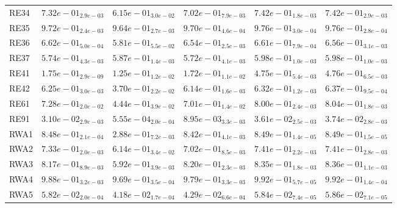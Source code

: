 \documentclass{article}
\begin{document}
\begin{table}
\begin{scriptsize}
\begin{tabular}{llllll}
RE34 & $  7.32e-01_{ 2.9e-03}$ & $  6.15e-01_{ 3.0e-02}$ & $  7.02e-01_{ 7.9e-03}$ & \cellcolor{gray95}$  7.42e-01_{ 1.8e-03}$ & \cellcolor{gray25}$  7.42e-01_{ 2.9e-03}$ \\
RE35 & $  9.72e-01_{ 2.4e-03}$ & $  9.64e-01_{ 2.7e-03}$ & $  9.70e-01_{ 4.6e-04}$ & \cellcolor{gray95}$  9.76e-01_{ 3.0e-04}$ & \cellcolor{gray25}$  9.76e-01_{ 2.8e-04}$ \\
RE36 & \cellcolor{gray95}$  6.62e-01_{ 5.0e-04}$ & $  5.81e-01_{ 5.5e-02}$ & $  6.54e-01_{ 2.5e-03}$ & \cellcolor{gray25}$  6.61e-01_{ 7.9e-04}$ & $  6.56e-01_{ 3.1e-03}$ \\
RE37 & $  5.74e-01_{ 4.3e-03}$ & $  5.87e-01_{ 1.4e-03}$ & $  5.72e-01_{ 4.1e-03}$ & \cellcolor{gray95}$  5.98e-01_{ 1.0e-03}$ & \cellcolor{gray25}$  5.98e-01_{ 1.0e-03}$ \\
RE41 & $  1.75e-01_{ 2.9e-09}$ & $  1.25e-01_{ 1.2e-02}$ & $  1.72e-01_{ 1.1e-02}$ & \cellcolor{gray25}$  4.75e-01_{ 5.4e-03}$ & \cellcolor{gray95}$  4.76e-01_{ 6.5e-03}$ \\
RE42 & $  6.25e-01_{ 3.0e-03}$ & $  3.70e-01_{ 2.2e-02}$ & $  6.14e-01_{ 1.6e-03}$ & \cellcolor{gray25}$  6.32e-01_{ 1.2e-03}$ & \cellcolor{gray95}$  6.37e-01_{ 9.5e-04}$ \\
RE61 & $  7.28e-01_{ 2.0e-02}$ & $  4.44e-01_{ 3.9e-02}$ & $  7.01e-01_{ 1.4e-02}$ & \cellcolor{gray25}$  8.00e-01_{ 2.4e-03}$ & \cellcolor{gray95}$  8.04e-01_{ 1.8e-03}$ \\
RE91 & $  3.10e-02_{ 2.9e-03}$ & $  5.55e-04_{ 2.0e-04}$ & $  8.95e-03_{ 3.3e-03}$ & \cellcolor{gray25}$  3.61e-02_{ 2.5e-03}$ & \cellcolor{gray95}$  3.74e-02_{ 2.8e-03}$ \\
RWA1 & $  8.48e-01_{ 2.1e-04}$ & $  2.88e-01_{ 7.2e-03}$ & $  8.42e-01_{ 4.1e-03}$ & \cellcolor{gray95}$  8.49e-01_{ 1.4e-05}$ & \cellcolor{gray25}$  8.49e-01_{ 1.5e-05}$ \\
RWA2 & $  7.33e-01_{ 2.0e-03}$ & $  6.14e-01_{ 3.4e-02}$ & $  7.02e-01_{ 8.5e-03}$ & \cellcolor{gray25}$  7.41e-01_{ 2.2e-03}$ & \cellcolor{gray95}$  7.41e-01_{ 2.8e-03}$ \\
RWA3 & $  8.17e-01_{ 8.9e-03}$ & $  5.92e-01_{ 3.9e-03}$ & $  8.20e-01_{ 2.3e-03}$ & \cellcolor{gray25}$  8.35e-01_{ 1.8e-03}$ & \cellcolor{gray95}$  8.36e-01_{ 1.1e-03}$ \\
RWA4 & $  9.88e-01_{ 3.2e-03}$ & $  9.69e-01_{ 3.5e-04}$ & $  9.79e-01_{ 3.3e-03}$ & \cellcolor{gray25}$  9.92e-01_{ 5.7e-05}$ & \cellcolor{gray95}$  9.92e-01_{ 1.4e-04}$ \\
RWA5 & $  5.82e-02_{ 2.0e-04}$ & $  4.18e-02_{ 1.7e-04}$ & $  4.29e-02_{ 6.6e-04}$ & \cellcolor{gray25}$  5.84e-02_{ 7.4e-05}$ & \cellcolor{gray95}$  5.86e-02_{ 7.1e-05}$ \\

\end{tabular}
\end{scriptsize}
\end{table}
\end{document}
